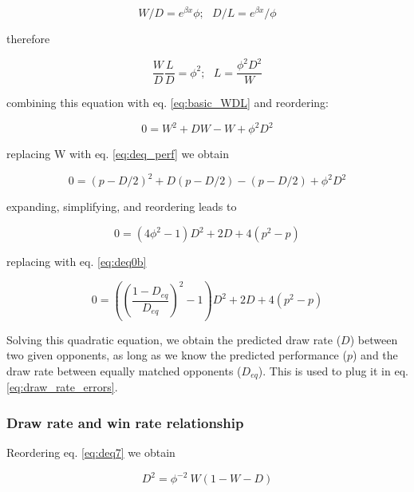 \documentclass[12pt]{article}
\begin{document}
	\begin{equation} \label{eq:deq4}
	W/D = e^{\beta x} \phi;\:\:\:
	D/L = e^{\beta x} / \phi
	\end{equation}

therefore

	\begin{equation} \label{eq:deq_wldd}
	\frac{W}{D} \frac{L}{D} = \phi^2; \:\:\: L = \frac{\phi^2 D^2}{W}
	\end{equation}

combining this equation with eq. \ref{eq:basic_WDL} and reordering: 

	\begin{equation} \label{eq:deq7}
	0 = W^2 + D W - W + \phi^2 D^2
	\end{equation}

replacing W with eq. \ref{eq:deq_perf} we obtain

	\begin{equation} \label{eq:deq9}
	0 = (p - D/2)^2 + D (p - D/2) - (p - D/2) + \phi^2 D^2
	\end{equation}

expanding, simplifying, and reordering leads to

	\begin{equation} \label{eq:deq10}
	0 = (4 \phi^2 -1) D^2 + 2 D + 4 (p^2 - p)
	\end{equation}

replacing with eq. \ref{eq:deq0b}

	\begin{equation} \label{eq:deq11}
	0 = \left( 
			\left(\frac {1-D_{eq}} 
			{D_{eq}}
			\right) ^2 -1
		\right) 
		D^2 + 2 D + 4 (p^2 - p)
	\end{equation}

Solving this quadratic equation, we obtain the predicted draw rate ($D$) between two given opponents, as long as we know the predicted performance ($p$) and the draw rate between equally matched opponents ($D_{eq}$). This is used to plug it in eq. \ref{eq:draw_rate_errors}.

\subsubsection*{Draw rate and win rate relationship}

Reordering eq. \ref{eq:deq7} we obtain

	\begin{equation} \label{eq:draw_rate1}
	D^2 = \phi^{-2}\: W (1 - W - D)  
	\end{equation}
\end{document}
